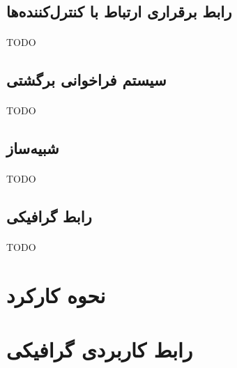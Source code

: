 \subsection{رابط برقراری ارتباط با کنترل‌کننده‌ها}
\label{subsec:connector}
\paragraph{}
{
    TODO
}

\subsection{سیستم فراخوانی برگشتی}
\label{subsec:callbacks}
\paragraph{}
{
    TODO
}

\subsection{شبیه‌ساز‍}
\label{subsec:simulator}
\paragraph{}
{
    TODO
}

\subsection{رابط گرافیکی}
\label{subsec:gui}
\paragraph{}
{
    TODO
}


\section{نحوه کارکرد}
\paragraph{}{}

\section{رابط کاربردی گرافیکی}
\paragraph{}{

}

